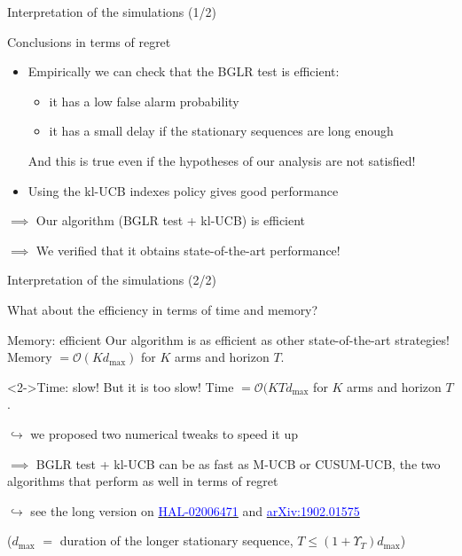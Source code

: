 \documentclass[11pt,english,ignorenonframetext,]{beamer}
\providecommand{\tightlist}{%
  \setlength{\itemsep}{0pt}\setlength{\parskip}{0pt}}
\begin{document}
\begin{frame}{Interpretation of the simulations (1/2)}

  \begin{block}{Conclusions in terms of regret}
    \begin{itemize}
      \item
      Empirically we can check that the \alert{BGLR test is efficient}:
      \begin{itemize}\tightlist
        \item
        it has a \alert{low false alarm probability}
        \item
        it has a \alert{small delay} if the stationary sequences are long enough
      \end{itemize}
      And this is true even if the hypotheses of our analysis are not satisfied!
      \item
      Using the kl-UCB indexes policy gives good performance
    \end{itemize}
    $\implies$ Our algorithm (BGLR test + kl-UCB) is efficient

    $\implies$ We verified that it obtains state-of-the-art performance!
  \end{block}

\end{frame}


\begin{frame}{Interpretation of the simulations (2/2)}

  What about the efficiency in terms of time and memory?

  \begin{block}{Memory: efficient}
    Our algorithm is as efficient as other state-of-the-art strategies!\\
    Memory $= \mathcal{O}(K d_{\max})$
    for $K$ arms and horizon $T$.
  \end{block}

  \begin{alertblock}<2->{Time: slow!}
    But it is too slow!
    Time $= \mathcal{O}(K T d_{\max}$
    for $K$ arms and horizon $T$.

    $\hookrightarrow$ we proposed two numerical tweaks to speed it up

    $\implies$ BGLR test + kl-UCB can be as fast as M-UCB or CUSUM-UCB, the two algorithms that perform as well in terms of regret

    $\hookrightarrow$  see the long version on \href{https://hal.inria.fr/hal-02006471}{\textcolor{blue}{HAL-02006471}} and \href{https://arxiv.org/abs/1902.01575}{\textcolor{blue}{arXiv:1902.01575}}
  \end{alertblock}

  ($d_{\max}$ $=$ duration of the longer stationary sequence, $T \leq (1+\Upsilon_T) d_{\max}$)

\end{frame}
\end{document}
